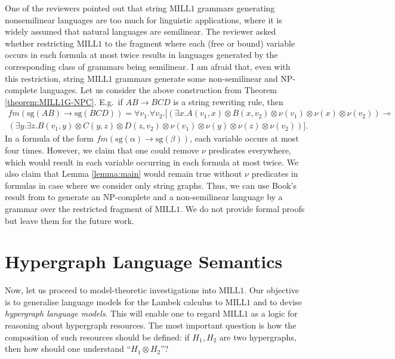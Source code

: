 \documentclass[a4paper,UKenglish,cleveref, autoref, thm-restate,pdfa]{lipics-v2021}
\newcommand{\SG}{\mathrm{sg}}
\newcommand{\mconj}{\otimes}
\newcommand{\limpl}{\multimap}
\newcommand{\MILLFO}{\mathrm{MILL}1}
\newcommand{\fm}{\mathit{fm}}
\begin{document}
One of the reviewers pointed out that string $\MILLFO$ grammars generating nonsemilinear languages are too much for linguistic applications, where it is widely assumed that natural languages are semilinear. The reviewer asked whether restricting $\MILLFO$ to the fragment where each (free or bound) variable occurs in each formula at most twice results in languages generated by the corresponding class of grammars being semilinear. I am afraid that, even with this restriction, string $\MILLFO$ grammars generate some non-semilinear and NP-complete languages. Let us consider the above construction from Theorem \ref{theorem:MILL1G-NPC}. E.g.~if $AB \to BCD$ is a string rewriting rule, then 
\begin{multline*}
	\fm(\SG(AB) \to \SG(BCD)) = \forall v_1.\forall v_2. \big[\left(\exists x.A(v_1,x)\otimes B(x,v_2) \otimes \nu(v_1) \otimes \nu(x) \otimes \nu(v_2)\right) \limpl  \\ \left(\exists y. \exists z.B(v_1,y)\otimes C(y,z) \otimes D(z,v_2) \otimes \nu(v_1) \otimes \nu(y) \otimes \nu(z) \otimes \nu(v_2)\right)\big].
\end{multline*}
In a formula of the form $\fm(\SG(\alpha) \to \SG(\beta))$, each variable occurs at most four times. However, we claim that one could remove $\nu$ predicates everywhere, which would result in each variable occurring in each formula at most twice. We also claim that Lemma \ref{lemma:main} would remain true without $\nu$ predicates in formulas in case where we consider only string graphs. Thus, we can use Book's result from \cite{Book78} to generate an NP-complete and a non-semilinear language by a grammar over the restricted fragment of $\MILLFO$. We do not provide formal proofs but leave them for the future work.


\section{Hypergraph Language Semantics}\label{section:semantics}

Now, let us proceed to model-theoretic investigations into $\MILLFO$. Our objective is to generalise language models for the Lambek calculus to $\MILLFO$ and to devise \emph{hypergraph language models}. This will enable one to regard $\MILLFO$ as a logic for reasoning about hypergraph resources. The most important question is how the composition of such resources should be defined: if $H_1,H_2$ are two hypergraphs, then how should one understand ``$H_1 \mconj H_2$''? 
\end{document}
